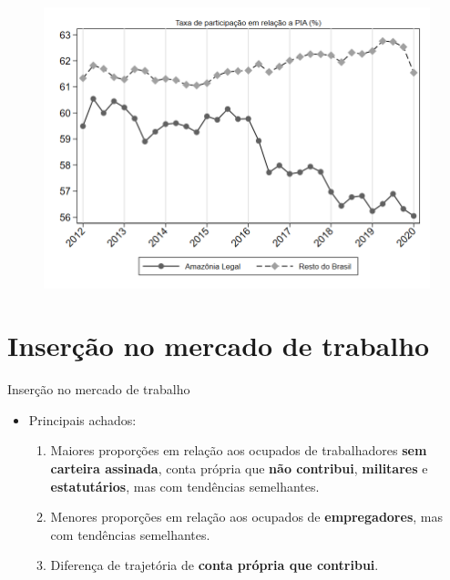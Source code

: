 \documentclass[11pt]{beamer}
\begin{document}
\begin{frame}[label=_estrutura_emprego_taxa_de_participacao]{}
\begin{figure}
  \centering
  \includegraphics[width=1.0\linewidth]{../../analysis/output/estrutura_emprego/_estrutura_emprego_taxa_de_participacao.png}
  \caption{}
  \label{fig:_estrutura_emprego_taxa_de_participacao}
\end{figure}
\end{frame}

%

\section{Inserção no mercado de trabalho}

\begin{frame}
\centering
{\huge Inserção no mercado de trabalho}

\vspace{4mm}
\begin{itemize}
	\item{Principais achados:
	\vspace{3mm}
	\begin{enumerate}
		\item{Maiores proporções em relação aos ocupados de trabalhadores \textbf{sem carteira assinada}, conta própria que \textbf{não contribui}, \textbf{militares} e \textbf{estatutários}, mas com tendências semelhantes.}
		\vspace{1mm}
		\item{Menores proporções em relação aos ocupados de \textbf{empregadores},  mas com tendências semelhantes.}
		\vspace{1mm}
		\item{Diferença de trajetória de \textbf{conta própria que contribui}.}
	\end{enumerate}
	}
\end{itemize}


\end{frame}
\end{document}
